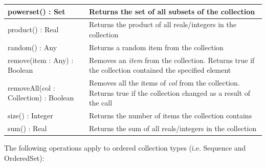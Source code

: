 \begin{longtabu} {|p{6.5cm}|X|}
    powerset() : Set & Returns the set of all subsets of the collection \\\hline

    product() : Real & Returns the product of all reals/integers in the collection\\\hline
    
    random() : Any & Returns a random item from the collection \\\hline
    
    remove(item : Any) : Boolean & Removes an \emph{item} from the collection. Returns true if the collection contained the specified element\\\hline
    
    removeAll(col : Collection) : Boolean & Removes all the items of \emph{col} from the collection. Returns
    true if the collection changed as a result of the call \\\hline
    
    size() : Integer & Returns the number of items the collection contains \\\hline
    
    sum() : Real & Returns the sum of all reals/integers in the collection\\\hline
\end{longtabu}

The following operations apply to ordered collection types (i.e. Sequence and OrderedSet):

